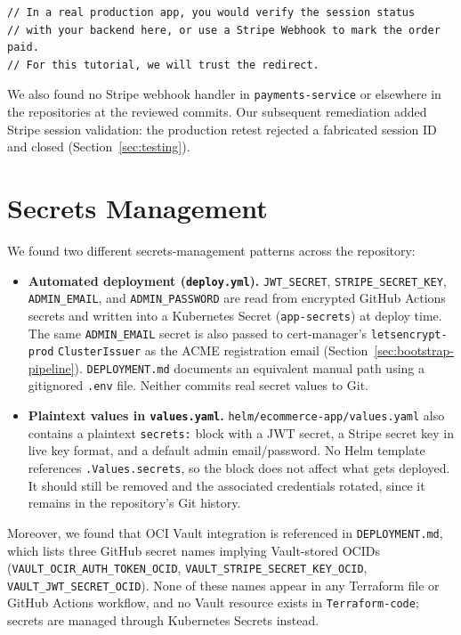 \begin{lstlisting}[language={}, caption={\texttt{src/app/(store)/checkout/success/page.tsx}}]
// In a real production app, you would verify the session status
// with your backend here, or use a Stripe Webhook to mark the order paid.
// For this tutorial, we will trust the redirect.
\end{lstlisting}

We also found no Stripe webhook handler in \texttt{payments-service} or
elsewhere in the repositories at the reviewed commits. Our subsequent remediation added Stripe
session validation: the production retest rejected a fabricated session ID and
closed  (Section~\ref{sec:testing}).

\section{Secrets Management}\label{sec:sec-secrets}
We found two different secrets-management patterns across the repository:

\begin{itemize}[leftmargin=1.4em]
  \item \textbf{Automated deployment (\texttt{deploy.yml}).} \texttt{JWT\_SECRET},
        \texttt{STRIPE\_SECRET\_KEY}, \texttt{ADMIN\_EMAIL}, and
        \texttt{ADMIN\_PASSWORD} are read from encrypted GitHub Actions secrets and
        written into a Kubernetes Secret (\texttt{app-secrets}) at deploy time.
        The same \texttt{ADMIN\_EMAIL} secret is also passed to cert-manager's
        \texttt{letsencrypt-prod} \texttt{ClusterIssuer} as the ACME registration
        email (Section~\ref{sec:bootstrap-pipeline}).
        \texttt{DEPLOYMENT.md} documents an equivalent manual path using a
        gitignored \texttt{.env} file. Neither commits real secret values to Git.
  \item \textbf{Plaintext values in \texttt{values.yaml}.}
        \texttt{helm/ecommerce-app/values.yaml} also contains a plaintext
        \texttt{secrets:} block with a JWT secret, a Stripe secret key in live key
        format, and a default admin email/password. No Helm template references
        \texttt{.Values.secrets}, so the block does not affect what gets deployed.
        It should still be removed and the associated credentials rotated, since it
        remains in the repository's Git history.
\end{itemize}

Moreover, we found that OCI Vault integration is referenced in \texttt{DEPLOYMENT.md}, which lists three
GitHub secret names implying Vault-stored OCIDs
(\texttt{VAULT\_OCIR\_AUTH\_TOKEN\_OCID}, \texttt{VAULT\_STRIPE\_SECRET\_KEY\_OCID},
\texttt{VAULT\_JWT\_SECRET\_OCID}). None of these names appear in any Terraform file
or GitHub Actions workflow, and no Vault resource exists in
\texttt{Terraform-code}; secrets are managed through Kubernetes Secrets instead.

